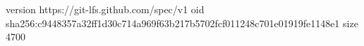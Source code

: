 version https://git-lfs.github.com/spec/v1
oid sha256:c9448357a32ff1d30c714a969f63b217b5702fcf011248c701e01919fe1148e1
size 4700
